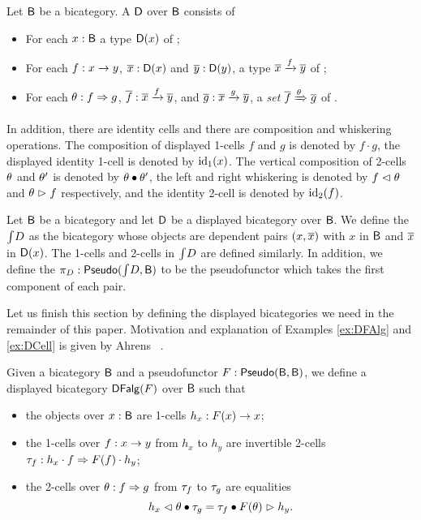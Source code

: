 \begin{definition}
Let $\mathsf{B}$ be a bicategory.
A  $\mathsf{D}$ over $\mathsf{B}$ consists of
\begin{itemize}
	\item For each $x : \mathsf{B}$ a type ${\mathsf{D}}(x)$ of ;
	\item For each $f : x \rightarrow y$, $\overline{x} : {\mathsf{D}}(x)$ and $\overline{y} : {\mathsf{D}}(y)$,
	a type $\overline{x} \xrightarrow{f} \overline{y}$ of ;
	\item For each $\theta : f \Rightarrow g$, $\overline{f} : \overline{x} \xrightarrow{f} \overline{y}$, and $\overline{g} : \overline{x} \xrightarrow{g} \overline{y}$, a \emph{set} $\overline{f} \xRightarrow{\theta} \overline{g}$ of .
\end{itemize}
In addition, there are identity cells and there are composition and whiskering operations.
The composition of displayed 1-cells $f$ and $g$ is denoted by $f \cdot g$, the displayed identity 1-cell is denoted by $\operatorname{id}_1(x)$.
The vertical composition of 2-cells $\theta$ and $\theta'$ is denoted by $\theta \bullet \theta'$, the left and right whiskering is denoted by $f \vartriangleleft \theta$ and $\theta \vartriangleright f$ respectively,
and the identity 2-cell is denoted by $\operatorname{id}_2(f)$. 
\end{definition}

\begin{definition}
\label{def:totalbicat}
Let $\mathsf{B}$ be a bicategory and let $\mathsf{D}$ be a displayed bicategory over $\mathsf{B}$.
We define the  $\textstyle \int_{}{D}$ as the bicategory whose objects are dependent pairs $(x, \overline{x})$ with $x$ in $\mathsf{B}$ and $\overline{x}$ in ${\mathsf{D}}(x)$.
The 1-cells and 2-cells in $\textstyle \int_{}{D}$ are defined similarly.
In addition, we define the  $\pi_{D} : \mathsf{Pseudo}(\textstyle \int_{}{D}, \mathsf{B})$ to be the pseudofunctor which takes the first component of each pair.
\end{definition}

Let us finish this section by defining the displayed bicategories we need in the remainder of this paper.
Motivation and explanation of Examples \ref{ex:DFAlg} and \ref{ex:DCell} is given by Ahrens \etal \ \cite{bicatjournal}.

\begin{example}
\label{ex:DFAlg}
Given a bicategory $\mathsf{B}$ and a pseudofunctor $F : \mathsf{Pseudo}(\mathsf{B}, \mathsf{B})$,
we define a displayed bicategory $\mathsf{DFalg}(F)$ over $\mathsf{B}$ such that
\begin{itemize}
	\item the objects over $x : \mathsf{B}$ are 1-cells $h_x : F(x) \rightarrow x$;
	\item the 1-cells over $f : x \rightarrow y$ from $h_x$ to $h_y$ are invertible 2-cells $\tau_f : h_x \cdot f \Rightarrow F(f) \cdot h_y$;
	\item the 2-cells over $\theta : f \Rightarrow g$ from $\tau_f$ to $\tau_g$ are equalities
	\begin{equation*}\label{eq:twocell_alg}
	h_x \vartriangleleft \theta \bullet \tau_g = \tau_f \bullet F(\theta) \vartriangleright h_y.
	\end{equation*}
\end{itemize}
\end{example}

